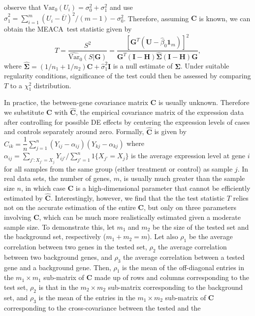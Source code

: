 \documentclass[a4,center,fleqn]{NAR}
\newcommand{\OurMethod}{MEACA}
\begin{document}
	observe
	that $\mbox{Var}_{0}(U_i)=\sigma_0^2+\sigma_1^2$ and use
	$\hat\sigma_1^2=\sum_{i=1}^m(U_i-\overline{U})^2/(m-1)-\sigma_0^2$. Therefore, assuming $\bm C$ 
	is
	known, we can obtain the \OurMethod~test statistic given by
	\begin{equation}\label{eq:meqleastat}
	T = \dfrac{S^2}{\widehat{\mbox{Var}}_{0}(S|\bm G)} = \dfrac{[\bm G^T(\bm U-\hat\beta_0\bm
		1_m)]^2}{\bm G^T(\bm I-\bm H)\hat{\bm\Sigma}(\bm I-\bm H)\bm G}, 
	\end{equation}
	where $\hat{\bm\Sigma}=(1/n_1+1/n_2)\bm C+\hat\sigma_1^2\bm I$ is a null estimate of $\bm 
	\Sigma$. Under suitable regularity conditions, significance of the test could then be assessed 
	by comparing $T$ to a $\chi^2_1$ distribution.
	
	
	In practice, the between-gene covariance matrix $\bm C$ is usually unknown. Therefore we 
	substitute $\bm C$ with $\hat {\bm C}$, the empirical covariance matrix of the expression data 
	after controlling for
	possible DE effects by centering the expression levels of cases and controls separately around
	zero. Formally, $\hat {\bm C}$ is given by $\hat
	C_{ik}=\dfrac{1}{n}\sum_{j=1}^n(Y_{ij}-\alpha_{ij})(Y_{kj}-\alpha_{kj})$ where
	$\alpha_{ij}=\sum_{j':X_{j'}=X_{j}}Y_{ij'}/\sum_{j'=1}^n1\{X_{j'}=X_{j}\}$ is the average 
	expression level at gene $i$ for all samples from the same group (either treatment or control) 
	as sample $j$. In real data sets, the number of genes, $m$, is usually much greater than the 
	sample size $n$, in
	which case $\bm C$ is a high-dimensional parameter that cannot be efficiently estimated by $\hat
	{\bm C}$. Interestingly, however, we find that the the test statistic $T$ relies not on
	the accurate estimation of the entire $\bm C$, but only on three parameters involving $\bm C$, 
	which can be much more realistically estimated given a moderate sample size. To demonstrate 
	this, let $m_1$ and $m_2$ be the size of the tested set and the background set, respectively 
	($m_1+m_2=m$). Let also $\rho_1$ be the average correlation between two genes in the tested 
	set, $\rho_2$  the average correlation between two background genes, and $\rho_3$ the 
	average 
	correlation between a tested gene and a background gene. Then, $\rho_1$ is the mean of the 
	off-diagonal entries in the $m_1\times m_1$ sub-matrix of $\bm C$ made up of rows and columns 
	corresponding to the test set, $\rho_2$ is that in the $m_2\times m_2$ sub-matrix corresponding 
	to the background set, and $\rho_3$ is the mean of the entries in the $m_1\times m_2$ 
	sub-matrix of $\bm C$ corresponding to the cross-covariance between the tested and the 
\end{document}
